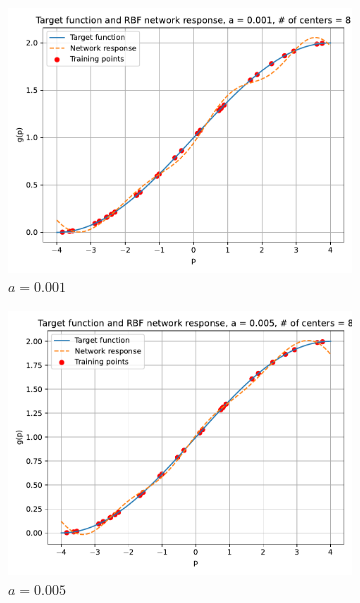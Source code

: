 \begin{figure}[htbp]
	\centering
	\begin{subfigure}{0.33\linewidth}
		\centering
		\includegraphics[width=\linewidth]{../Problem 2/prob2_response_a_0.001_Cnum_8.pdf}
		\caption{$a=0.001$}
	\end{subfigure}\hfill
	\begin{subfigure}{0.33\linewidth}
		\centering
		\includegraphics[width=\linewidth]{../Problem 2/prob2_response_a_0.005_Cnum_8.pdf}
		\caption{$a=0.005$}
	\end{subfigure}\hfill
	\begin{subfigure}{0.33\linewidth}
		\centering

\end{subfigure}
\end{figure}

